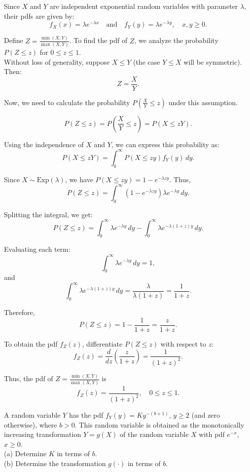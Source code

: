 \begin{solution}
Since \( X \) and \( Y \) are independent exponential random variables with parameter \( \lambda \), their pdfs are given by:
\[
f_X(x) = \lambda e^{-\lambda x} \quad \text{and} \quad f_Y(y) = \lambda e^{-\lambda y}, \quad x, y \geq 0.
\]

Define \( Z = \frac{\min(X, Y)}{\max(X, Y)} \). To find the pdf of \( Z \), we analyze the probability \( P(Z \leq z) \) for \( 0 \leq z \leq 1 \).\\

   Without loss of generality, suppose \( X \leq Y \) (the case \( Y \leq X \) will be symmetric). Then:
   \[
   Z = \frac{X}{Y}.
   \]
   
   Now, we need to calculate the probability \( P\left( \frac{X}{Y} \leq z \right) \) under this assumption.

   \[
   P\left( Z \leq z \right) = P\left( \frac{X}{Y} \leq z \right) = P\left( X \leq zY \right).
   \]
   
   Using the independence of \( X \) and \( Y \), we can express this probability as:
   \[
   P(X \leq zY) = \int_0^{\infty} P(X \leq zy) f_Y(y) \, dy.
   \]
   
   Since \( X \sim \text{Exp}(\lambda) \), we have \( P(X \leq zy) = 1 - e^{-\lambda zy} \). Thus,
   \[
   P(Z \leq z) = \int_0^{\infty} \left(1 - e^{-\lambda zy}\right) \lambda e^{-\lambda y} \, dy.
   \]
   
   Splitting the integral, we get:
   \[
   P(Z \leq z) = \int_0^{\infty} \lambda e^{-\lambda y} \, dy - \int_0^{\infty} \lambda e^{-\lambda(1+z)y} \, dy.
   \]
   
   Evaluating each term:
   \[
   \int_0^{\infty} \lambda e^{-\lambda y} \, dy = 1,
   \]
   and
   \[
   \int_0^{\infty} \lambda e^{-\lambda(1+z)y} \, dy = \frac{\lambda}{\lambda(1+z)} = \frac{1}{1+z}.
   \]
   
   Therefore,
   \[
   P(Z \leq z) = 1 - \frac{1}{1+z} = \frac{z}{1+z}.
   \]

   To obtain the pdf \( f_Z(z) \), differentiate \( P(Z \leq z) \) with respect to \( z \):
   \[
   f_Z(z) = \frac{d}{dz} \left( \frac{z}{1+z} \right) = \frac{1}{(1+z)^2}.
   \]

Thus, the pdf of \( Z = \frac{\min(X, Y)}{\max(X, Y)} \) is
\[
f_Z(z) = \frac{1}{(1+z)^2}, \quad 0 \leq z \leq 1.
\]
\end{solution}

\begin{exercise}
A random variable \( Y \) has the pdf \( f_Y(y) = K y^{-(b+1)} \), \( y \geq 2 \) (and zero otherwise), where \( b > 0 \). This random variable is obtained as the monotonically increasing transformation \( Y = g(X) \) of the random variable \( X \) with pdf \( e^{-x} \), \( x \geq 0 \).\\

(a) Determine \( K \) in terms of \( b \).\\
(b) Determine the transformation \( g(\cdot) \) in terms of \( b \).
\end{exercise}


